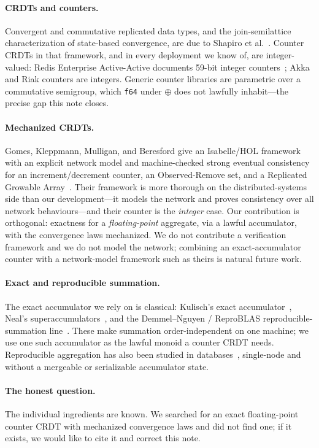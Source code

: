 \documentclass[11pt]{article}
\begin{document}
\paragraph{CRDTs and counters.} Convergent and commutative replicated data types, and the
join-semilattice characterization of state-based convergence, are due to Shapiro et
al.~\cite{shapiro}. Counter CRDTs in that framework, and in every deployment we know of, are
integer-valued: Redis Enterprise Active-Active documents 59-bit integer counters~\cite{redisdocs};
Akka and Riak counters are integers. Generic counter libraries are parametric over a commutative
semigroup, which \texttt{f64} under $\oplus$ does not lawfully inhabit---the precise gap this note
closes.

\paragraph{Mechanized CRDTs.} Gomes, Kleppmann, Mulligan, and Beresford give an
Isabelle/HOL framework with an explicit network model and machine-checked strong eventual consistency
for an increment/decrement counter, an Observed-Remove set, and a Replicated Growable
Array~\cite{gomes}. Their framework is more thorough on the distributed-systems side than our
development---it models the network and proves consistency over all network behaviours---and their
counter is the \emph{integer} case. Our contribution is orthogonal: exactness for a
\emph{floating-point} aggregate, via a lawful accumulator, with the convergence laws mechanized. We do
not contribute a verification framework and we do not model the network; combining an exact-accumulator
counter with a network-model framework such as theirs is natural future work.

\paragraph{Exact and reproducible summation.} The exact accumulator we rely on is classical:
Kulisch's exact accumulator~\cite{kulisch}, Neal's superaccumulators~\cite{neal}, and the
Demmel--Nguyen / ReproBLAS reproducible-summation line~\cite{demmel}. These make summation
order-independent on one machine; we use one such accumulator as the lawful monoid a counter CRDT needs.
Reproducible aggregation has also been studied in databases~\cite{muller}, single-node and without a
mergeable or serializable accumulator state.

\paragraph{The honest question.} The individual ingredients are known. We searched for an exact
floating-point counter CRDT with mechanized convergence laws and did not find one; if it exists, we
would like to cite it and correct this note.
\end{document}
